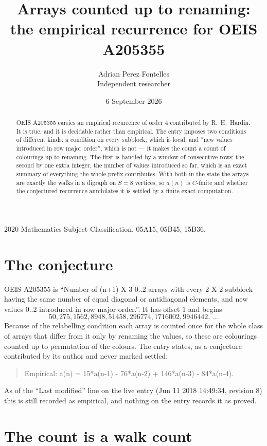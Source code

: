 \documentclass[11pt,a4paper]{article}
\title{Arrays counted up to renaming: the empirical recurrence for OEIS A205355}
\author{Adrian Perez Fontelles\\ \small Independent researcher}
\date{6 September 2026}
\theoremstyle{plain}
\theoremstyle{definition}
\begin{document}
\maketitle

\begin{abstract}
OEIS A205355 carries an empirical recurrence of order $4$ contributed by R.~H.~Hardin. It is
true, and it is decidable rather than empirical. The entry imposes two conditions of different
kinds: a condition on every subblock, which is local, and ``new values introduced in row major
order'', which is not --- it makes the count a count of colourings up to renaming. The first is
handled by a window of consecutive rows; the second by one extra integer, the number of values
introduced so far, which is an exact summary of everything the whole prefix contributes. With
both in the state the arrays are exactly the walks in a digraph on $S=8$ vertices, so $a(n)$
is $C$-finite and whether the conjectured recurrence annihilates it is settled by a finite
exact computation.
\end{abstract}

\noindent\small 2020 Mathematics Subject Classification. 05A15, 05B45, 15B36.\normalsize

\section{The conjecture}

OEIS A205355 is ``Number of (n+1) X 3 0..2 arrays with every 2 X 2 subblock having the same number of equal diagonal or antidiagonal elements, and new values 0..2 introduced in row major order.''. It has offset $1$ and begins
\[
50, 275, 1562, 8948, 51458, 296774, 1716002, 9946442,\ \dots
\]
Because of the relabelling condition each array is counted once for the whole class of arrays that differ from it only by renaming the values, so these are colourings counted up to permutation of the colours.
The entry states, as a conjecture contributed by its author and never marked settled:
\begin{quote}
Empirical: a(n) = 15*a(n-1) - 76*a(n-2) + 146*a(n-3) - 84*a(n-4).
\end{quote}
As of the ``Last modified'' line on the live entry (Jun 11 2018 14:49:34, revision 8) this is still
recorded as empirical, and nothing on the entry records it as proved.

\section{The count is a walk count}
\end{document}
